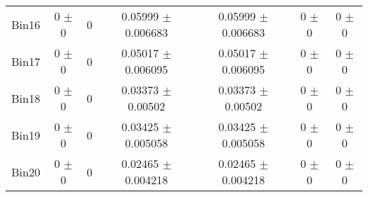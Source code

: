 \begin{tabular}{@{\extracolsep{4pt}}lcccccc@{}}
     Bin16 & 0 $\pm$ 0 & 0 & 0.05999 $\pm$ 0.006683 & 0.05999 $\pm$ 0.006683 & 0 $\pm$ 0 & 0 $\pm$ 0 \\ 
     Bin17 & 0 $\pm$ 0 & 0 & 0.05017 $\pm$ 0.006095 & 0.05017 $\pm$ 0.006095 & 0 $\pm$ 0 & 0 $\pm$ 0 \\ 
     Bin18 & 0 $\pm$ 0 & 0 & 0.03373 $\pm$ 0.00502 & 0.03373 $\pm$ 0.00502 & 0 $\pm$ 0 & 0 $\pm$ 0 \\ 
     Bin19 & 0 $\pm$ 0 & 0 & 0.03425 $\pm$ 0.005058 & 0.03425 $\pm$ 0.005058 & 0 $\pm$ 0 & 0 $\pm$ 0 \\ 
     Bin20 & 0 $\pm$ 0 & 0 & 0.02465 $\pm$ 0.004218 & 0.02465 $\pm$ 0.004218 & 0 $\pm$ 0 & 0 $\pm$ 0 \\ 
\hline\hline
  \end{tabular}
